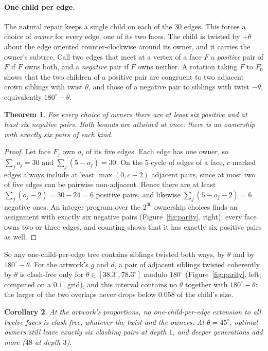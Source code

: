 \documentclass[11pt,a4paper]{article}
\newtheorem{theorem}{Theorem}
\newtheorem{corollary}[theorem]{Corollary}
\theoremstyle{definition}
\theoremstyle{remark}
\begin{document}
\paragraph{One child per edge.}  The natural repair keeps a single child on
each of the $30$ edges.  This forces a choice of \emph{owner} for every edge,
one of its two faces.  The child is twisted by $+\theta$ about the edge
oriented counter-clockwise around its owner, and it carries the owner's
subtree.  Call two edges that meet at a vertex of a face $F$ a
\emph{positive} pair of $F$ if $F$ owns both, and a \emph{negative} pair if
$F$ owns neither.  A rotation taking $F$ to $F_0$ shows that the two children
of a positive pair are congruent to two adjacent crown siblings with twist
$\theta$, and those of a negative pair to siblings with twist $-\theta$,
equivalently $180^\circ-\theta$.

\begin{theorem}\label{thm:parity}
For every choice of owners there are at least six positive and at least six
negative pairs.  Both bounds are attained at once: there is an ownership with
exactly six pairs of each kind.
\end{theorem}

\begin{proof}
Let face $F_j$ own $o_j$ of its five edges.  Each edge has one owner, so
$\sum_j o_j=30$ and $\sum_j(5-o_j)=30$.  On the $5$-cycle of edges of a face,
$c$ marked edges always include at least $\max(0,c-2)$ adjacent pairs, since
at most two of five edges can be pairwise non-adjacent.  Hence there are at
least $\sum_j(o_j-2)=30-24=6$ positive pairs, and likewise
$\sum_j(5-o_j-2)=6$ negative ones.  An integer program over the $2^{30}$
ownership choices finds an assignment with exactly six negative pairs
(Figure~\ref{fig:parity}, right); every face owns two or three edges, and
counting shows that it has exactly six positive pairs as well.
\end{proof}

So any one-child-per-edge tree contains siblings twisted both ways, by
$\theta$ and by $180^\circ-\theta$.  For the artwork's $g$ and $d$, a pair of
adjacent siblings twisted coherently by $\theta$ is clash-free only for
$\theta\in[38.3^\circ,78.3^\circ]$ modulo $180^\circ$ (Figure~\ref{fig:parity},
left; computed on a $0.1^\circ$ grid), and this interval contains no $\theta$
together with $180^\circ-\theta$: the larger of the two overlaps never drops
below $0.058$ of the child's size.

\begin{corollary}
At the artwork's proportions, no one-child-per-edge extension to all twelve
faces is clash-free, whatever the twist and the owners.  At $\theta=45^\circ$,
optimal owners still leave exactly six clashing pairs at depth $1$, and deeper
generations add more ($48$ at depth $3$).
\end{corollary}
\end{document}
